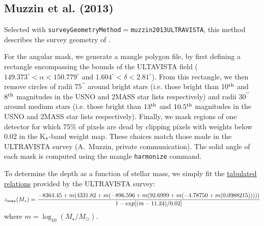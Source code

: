 \subsection{Muzzin et al. (2013)}\label{phys:surveyGeometry:surveyGeometryMuzzin2014ULTRAVISTA}

Selected with {\tt surveyGeometryMethod}$=${\tt muzzin2013ULTRAVISTA}, this method describes the survey geometry of \cite{muzzin_evolution_2013}. 

For the angular mask, we generate a \gls{mangle} polygon file, by first defining a rectangle encompassing the bounds of the ULTAVISTA field ($149.373^\circ < \alpha < 150.779^\circ$ and $1.604^\circ < \delta < 2.81^\circ$). From this rectangle, we then remove circles of radii $75^{\prime\prime}$ around bright stars (i.e. those bright than 10$^{\rm th}$ and $8^{\rm th}$ magnitudes in the USNO and 2MASS star lists respectively) and radii $30^{\prime\prime}$ around medium stars (i.e. those bright than $13^{\rm th}$ and $10.5^{\rm th}$ magnitudes in the USNO and 2MASS star lists respectively). Finally, we mask regions of one detector for which 75\% of pixels are dead by clipping pixels with weights below $0.02$ in the K$_{\rm s}$-band weight map. These choices match those made in the ULTRAVISTA survey (A.~Muzzin, private communication). The solid angle of each mask is computed using the \gls{mangle} {\tt harmonize} command.

To determine the depth as a function of stellar mass, we simply fit the \href{http://www.strw.leidenuniv.nl/galaxyevolution/ULTRAVISTA/Mstar_redshift_completeness_emp_uvista_v4.1_100.dat}{tabulated relations} provided by the ULTRAVISTA survey:
\begin{equation}
z_{\rm max}(M_\star) = {-8364.45 + m (4331.82 + m (-896.596 + m (92.6999 + m (-4.78750 + m (0.0988215))))) \over 1 - \exp[(m-11.24)/0.02] }
 \label{eq:MuzzinDepthPolynomial}
\end{equation}
where $m= \log_{10}(M_\star/M_\odot)$.

